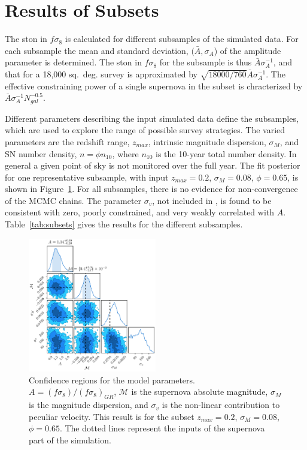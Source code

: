 \documentclass{aastex62}   	%
\begin{document}
\section{Results of Subsets}

The  ston in $f\sigma_8$ is calculated for different subsamples of the simulated data.
For each subsample  the mean  and standard deviation, $(\bar{A}, \sigma_A$) of the amplitude parameter is
determined.  The ston in $f\sigma_8$ for the subsample is thus  $\bar{A} \sigma^{-1}_A$, and that for a 18,000 sq.~deg. survey  is approximated by
$\sqrt{18000/760}\bar{A}\sigma^{-1}_A$.  The effective constraining power of a single supernova in the subset is chracterized by 
 $\bar{A} \sigma^{-1}_A N_{gal}^{-0.5}$.

Different parameters describing the input simulated data define the subsamples, 
which are used to explore the range of possible survey strategies.   The varied parameters are the redshift range, $z_{max}$, intrinsic
magnitude dispersion, $\sigma_M$, and SN number density, $n = \phi n_{10}$, where $ n_{10}$ is the  10-year total number density.  In general a given point
of sky is not monitored over the full year.  
The fit posterior for one representative subsample, with input  $z_{max}=0.2$, $\sigma_M=0.08$, $\phi=0.65$, is shown in Figure~\ref{zmax:fig}.
For all subsamples, there is no evidence for non-convergence of the MCMC chains.  The parameter $\sigma_v$, not included in  \citet{2015JCAP...12..033H, 2017JCAP...05..015H},
is found to be consistent with zero, poorly constrained, and very weakly correlated with $A$.  Table~\ref{tab:subsets} gives the results for the different subsamples.

\begin{figure}
\centering
\includegraphics[width=0.5\textwidth]{../outcosmo/pvlist.0.08.1234.0.65.0.2.pkl.png}
\caption{Confidence regions for the model parameters.  $A=(f\sigma_8)/(f\sigma_8)_{GR}$, $\mathcal{M}$ is the supernova
absolute magnitude, $\sigma_M$ is the magnitude dispersion, and $\sigma_v$ is the non-linear contribution
to peculiar velocity.  This result is for the subset $z_{max}=0.2$, $\sigma_M=0.08$, $\phi=0.65$.  The dotted lines represent the inputs of the supernova
part of the simulation.
\label{zmax:fig}}
\end{figure}
\end{document}

